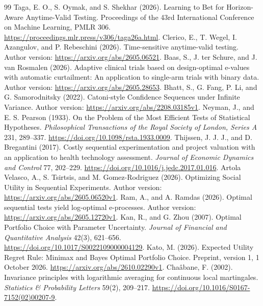 \documentclass[11pt,a4paper]{article}
\theoremstyle{remark}\newtheorem{remark}[theorem]{Remark}
\begin{document}
\begin{thebibliography}{99}
 Taga, E. O., S. Oymak, and S. Shekhar (2026).
Learning to Bet for Horizon-Aware Anytime-Valid Testing.
Proceedings of the 43rd International Conference on Machine Learning, PMLR 306.
\url{https://proceedings.mlr.press/v306/taga26a.html}.
 Clerico, E., T. Wegel, I. Azangulov, and P. Rebeschini (2026).
Time-sensitive anytime-valid testing.
Author version: \url{https://arxiv.org/abs/2605.06521}.
 Baas, S., J. ter Schure, and J. van Rosmalen (2026).
Adaptive clinical trials based on design-optimal e-values with automatic
curtailment: An application to single-arm trials with binary data.
Author version: \url{https://arxiv.org/abs/2605.28653}.
 Bhatt, S., G. Fang, P. Li, and G. Samorodnitsky (2022).
Catoni-style Confidence Sequences under Infinite Variance.
Author version: \url{https://arxiv.org/abs/2208.03185v1}.
 Neyman, J., and E. S. Pearson (1933).
On the Problem of the Most Efficient Tests of Statistical Hypotheses.
\emph{Philosophical Transactions of the Royal Society of London, Series A}
231, 289--337. \url{https://doi.org/10.1098/rsta.1933.0009}.
 Thijssen, J. J. J., and D. Bregantini (2017).
Costly sequential experimentation and project valuation with an application
to health technology assessment.
\emph{Journal of Economic Dynamics and Control} 77, 202--229.
\url{https://doi.org/10.1016/j.jedc.2017.01.016}.
 Artola Velasco, A., S. Tsirtsis, and M. Gomez-Rodriguez (2026).
Optimizing Social Utility in Sequential Experiments.
Author version: \url{https://arxiv.org/abs/2605.06520v1}.
 Ram, A., and A. Ramdas (2026).
Optimal sequential tests yield log-optimal e-processes.
Author version: \url{https://arxiv.org/abs/2605.12720v1}.
 Kan, R., and G. Zhou (2007).
Optimal Portfolio Choice with Parameter Uncertainty.
\emph{Journal of Financial and Quantitative Analysis} 42(3), 621--656.
\url{https://doi.org/10.1017/S0022109000004129}.
 Kato, M. (2026).
Expected Utility Regret Rule: Minimax and Bayes Optimal Portfolio Choice.
Preprint, version 1, 1 October 2026.
\url{https://arxiv.org/abs/2610.02290v1}.
 Chaâbane, F. (2002).
Invariance principles with logarithmic averaging for continuous local martingales.
\emph{Statistics \& Probability Letters} 59(2), 209--217.
\url{https://doi.org/10.1016/S0167-7152(02)00207-9}.
\end{thebibliography}
\endgroup
\end{document}

